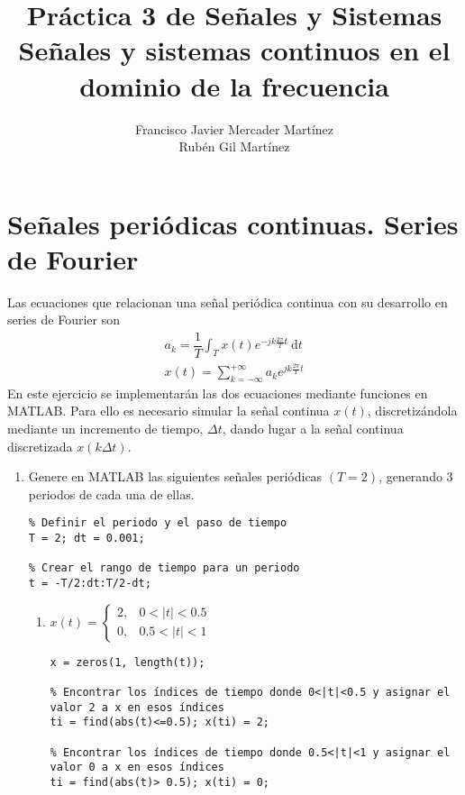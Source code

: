\documentclass{article}
\title{\textbf{\huge Práctica 3 de Señales y Sistemas}\\ Señales y sistemas continuos en el dominio de la frecuencia}
\author{Francisco Javier Mercader Martínez\\ Rubén Gil Martínez}
\date{}
\newcommand{\dt}{\:\mathrm{d}t}
\begin{document}
\section{Señales periódicas continuas. Series de Fourier}
Las ecuaciones que relacionan una señal periódica continua con su desarrollo en series de Fourier son \[ \begin{array}{l}
	a_k=\dfrac{1}{T}\int_Tx(t)e^{-jk\frac{2\pi}{T}t}\dt\\
	x(t)=\sum_{k=-\infty}^{+\infty}a_ke^{jk\frac{2\pi}{T}t}
\end{array} \]
En este ejercicio se implementarán las dos ecuaciones mediante funciones en MATLAB. Para ello es necesario simular la señal continua $x(t)$, discretizándola mediante un incremento de tiempo, $\Delta t$, dando lugar a la señal continua discretizada $x(k\Delta t)$.
\begin{enumerate}[leftmargin=*]
	\item Genere en MATLAB las siguientes señales periódicas $(T=2)$, generando 3 periodos de cada una de ellas.
	
	\begin{lstlisting}
% Definir el periodo y el paso de tiempo
T = 2; dt = 0.001;

% Crear el rango de tiempo para un periodo
t = -T/2:dt:T/2-dt;
	\end{lstlisting}
	\begin{enumerate}[label=\alph*)]
		\item $x(t)=\begin{cases}
			2, & 0<|t|<0.5\\
			0,&0.5<|t|<1
		\end{cases}$
		
		\begin{lstlisting}
x = zeros(1, length(t));

% Encontrar los índices de tiempo donde 0<|t|<0.5 y asignar el valor 2 a x en esos índices
ti = find(abs(t)<=0.5); x(ti) = 2;

% Encontrar los índices de tiempo donde 0.5<|t|<1 y asignar el valor 0 a x en esos índices
ti = find(abs(t)> 0.5); x(ti) = 0;


\end{lstlisting}
\end{enumerate}
\end{enumerate}
\end{document}
